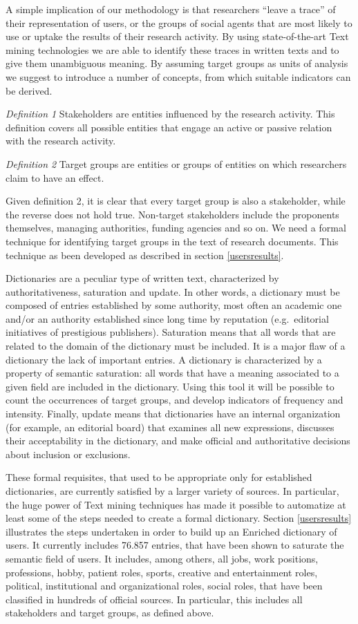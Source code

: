 \documentclass[b5paper,]{book}
\theoremstyle{definition}
\theoremstyle{definition}
\theoremstyle{definition}
\theoremstyle{remark}
\begin{document}
A simple implication of our methodology is that researchers ``leave a
trace'' of their representation of users, or the groups of social agents
that are most likely to use or uptake the results of their research
activity. By using state-of-the-art Text mining technologies we are able
to identify these traces in written texts and to give them unambiguous
meaning. By assuming target groups as units of analysis we suggest to
introduce a number of concepts, from which suitable indicators can be
derived.

\emph{Definition 1} Stakeholders are entities influenced by the research
activity. This definition covers all possible entities that engage an
active or passive relation with the research activity.

\emph{Definition 2} Target groups are entities or groups of entities on
which researchers claim to have an effect.

Given definition 2, it is clear that every target group is also a
stakeholder, while the reverse does not hold true. Non-target
stakeholders include the proponents themselves, managing authorities,
funding agencies and so on. We need a formal technique for identifying
target groups in the text of research documents. This technique as been
developed as described in section \ref{usersresults}.

Dictionaries are a peculiar type of written text, characterized by
authoritativeness, saturation and update. In other words, a dictionary
must be composed of entries established by some authority, most often an
academic one and/or an authority established since long time by
reputation (e.g.~editorial initiatives of prestigious publishers).
Saturation means that all words that are related to the domain of the
dictionary must be included. It is a major flaw of a dictionary the lack
of important entries. A dictionary is characterized by a property of
semantic saturation: all words that have a meaning associated to a given
field are included in the dictionary. Using this tool it will be
possible to count the occurrences of target groups, and develop
indicators of frequency and intensity. Finally, update means that
dictionaries have an internal organization (for example, an editorial
board) that examines all new expressions, discusses their acceptability
in the dictionary, and make official and authoritative decisions about
inclusion or exclusions.

These formal requisites, that used to be appropriate only for
established dictionaries, are currently satisfied by a larger variety of
sources. In particular, the huge power of Text mining techniques has
made it possible to automatize at least some of the steps needed to
create a formal dictionary. Section \ref{usersresults} illustrates the
steps undertaken in order to build up an Enriched dictionary of users.
It currently includes 76.857 entries, that have been shown to saturate
the semantic field of users. It includes, among others, all jobs, work
positions, professions, hobby, patient roles, sports, creative and
entertainment roles, political, institutional and organizational roles,
social roles, that have been classified in hundreds of official sources.
In particular, this includes all stakeholders and target groups, as
defined above.
\end{document}
